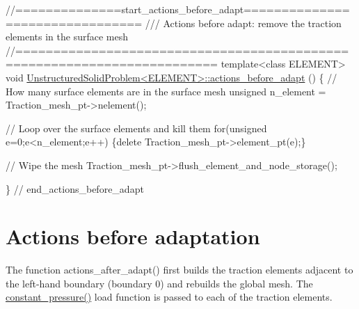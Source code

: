  
\begin{DoxyCodeInclude}
\textcolor{comment}{//==============start\_actions\_before\_adapt================================}
\textcolor{comment}{/// Actions before adapt: remove the traction elements in the surface mesh}
\textcolor{comment}{}\textcolor{comment}{//========================================================================}
\textcolor{keyword}{template}<\textcolor{keyword}{class} ELEMENT>
\textcolor{keywordtype}{void} \hyperlink{classUnstructuredSolidProblem_a463b4b976fdd12129ac2bd23bece1b8b}{UnstructuredSolidProblem<ELEMENT>::actions\_before\_adapt}
      ()
\{
 \textcolor{comment}{// How many surface elements are in the surface mesh}
 \textcolor{keywordtype}{unsigned} n\_element = Traction\_mesh\_pt->nelement();
 
 \textcolor{comment}{// Loop over the surface elements and kill them}
 \textcolor{keywordflow}{for}(\textcolor{keywordtype}{unsigned} e=0;e<n\_element;e++) \{\textcolor{keyword}{delete} Traction\_mesh\_pt->element\_pt(e);\}
 
 \textcolor{comment}{// Wipe the mesh}
 Traction\_mesh\_pt->flush\_element\_and\_node\_storage();

\} \textcolor{comment}{// end\_actions\_before\_adapt}

\end{DoxyCodeInclude}




 

\hypertarget{index_adapt_after}{}\section{Actions before adaptation}\label{index_adapt_after}
The function {\ttfamily actions\+\_\+after\+\_\+adapt()} first builds the traction elements adjacent to the left-\/hand boundary (boundary 0) and rebuilds the global mesh. The {\ttfamily \hyperlink{namespaceGlobal__Physical__Variables_a19f4e20a92e7d216b4d2b00308f96917}{constant\+\_\+pressure()}} load function is passed to each of the traction elements.


